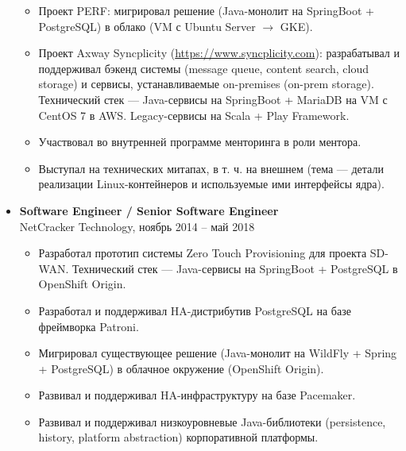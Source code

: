 \documentclass[letterpaper, 11pt]{article}
\begin{document}
\begin{itemize}
            \begin{itemize}
                \item
                    Проект PERF: мигрировал решение (Java-монолит на SpringBoot + PostgreSQL) в облако (VM с Ubuntu Server $\rightarrow$ GKE).
                \item
                    Проект Axway Syncplicity (\url{https://www.syncplicity.com}): разрабатывал и поддерживал бэкенд системы (message queue, content search, cloud storage) и сервисы, устанавливаемые on-premises (on-prem storage). Технический стек --- Java-сервисы на SpringBoot + MariaDB на VM с CentOS 7 в AWS. Legacy-сервисы на Scala + Play Framework.
                \item
                    Участвовал во внутренней программе менторинга в роли ментора.
                \item
                    Выступал на технических митапах, в т. ч. на внешнем (тема --- детали реализации Linux-контейнеров и используемые ими интерфейсы ядра).
            \end{itemize}

        \item
            \textbf{Software Engineer / Senior Software Engineer} \\
            \footnotesize
                NetCracker Technology, ноябрь 2014 -- май 2018
            \normalsize

            \begin{itemize}
                \item
                    Разработал прототип системы Zero Touch Provisioning для проекта SD-WAN. Технический стек --- Java-сервисы на SpringBoot + PostgreSQL в OpenShift Origin.
                \item
                    Разработал и поддерживал HA-дистрибутив PostgreSQL на базе фреймворка Patroni.
                \item
                    Мигрировал существующее решение (Java-монолит на WildFly + Spring + PostgreSQL) в облачное окружение (OpenShift Origin).
                \item
                    Развивал и поддерживал HA-инфраструктуру на базе Pacemaker.
                \item
                    Развивал и поддерживал низкоуровневые Java-библиотеки (persistence, history, platform abstraction) корпоративной платформы.
            \end{itemize}
    \end{itemize}
\end{document}
